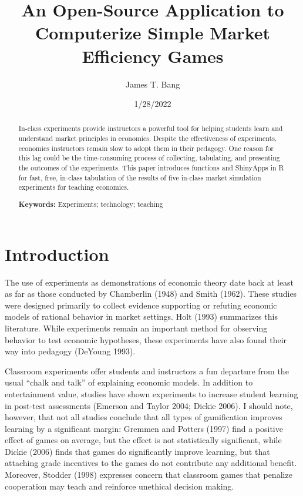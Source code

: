 \documentclass[
]{article}
\title{An Open-Source Application to Computerize Simple Market
Efficiency Games}
\author{James T. Bang}
\date{1/28/2022}
\begin{document}
\maketitle
\begin{abstract}
In-class experiments provide instructors a powerful tool for helping
students learn and understand market principles in economics. Despite
the effectiveness of experiments, economics instructors remain slow to
adopt them in their pedagogy. One reason for this lag could be the
time-consuming process of collecting, tabulating, and presenting the
outcomes of the experiments. This paper introduces functions and
ShinyApps in R for fast, free, in-class tabulation of the results of
five in-class market simulation experiments for teaching economics.

\textbf{Keywords:} Experiments; technology; teaching
\end{abstract}

\hypertarget{introduction}{%
\section{Introduction}\label{introduction}}

The use of experiments as demonstrations of economic theory date back at
least as far as those conducted by Chamberlin (1948) and Smith (1962).
These studies were designed primarily to collect evidence supporting or
refuting economic models of rational behavior in market settings. Holt
(1993) summarizes this literature. While experiments remain an important
method for observing behavior to test economic hypotheses, these
experiments have also found their way into pedagogy (DeYoung 1993).

Classroom experiments offer students and instructors a fun departure
from the usual ``chalk and talk'' of explaining economic models. In
addition to entertainment value, studies have shown experiments to
increase student learning in post-test assessments (Emerson and Taylor
2004; Dickie 2006). I should note, however, that not all studies
conclude that all types of gamification improves learning by a
significant margin: Gremmen and Potters (1997) find a positive effect of
games on average, but the effect is not statistically significant, while
Dickie (2006) finds that games do significantly improve learning, but
that attaching grade incentives to the games do not contribute any
additional benefit. Moreover, Stodder (1998) expresses concern that
classroom games that penalize cooperation may teach and reinforce
unethical decision making.
\end{document}
